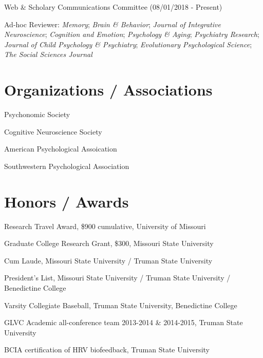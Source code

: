 \documentclass[11pt, a4paper]{awesome-cv}
\begin{document}
Web \& Scholary Communications Committee (08/01/2018 - Present)

Ad-hoc Reviewer: \emph{Memory}; \emph{Brain \& Behavior}; \emph{Journal of Integrative Neuroscience}; \emph{Cognition and Emotion}; \emph{Psychology \& Aging}; \emph{Psychiatry Research}; \emph{Journal of Child Psychology \& Psychiatry}; \emph{Evolutionary Psychological Science}; \emph{The Social Sciences Journal}

\hypertarget{organizations-associations}{%
\section{Organizations / Associations}\label{organizations-associations}}

Psychonomic Society

Cognitive Neuroscience Society

American Psychological Assoication

Southwestern Psychological Association

\hypertarget{honors-awards}{%
\section{Honors / Awards}\label{honors-awards}}

Research Travel Award, \$900 cumulative, University of Missouri

Graduate College Research Grant, \$300, Missouri State University

Cum Laude, Missouri State University / Truman State University

President's List, Missouri State University / Truman State University / Benedictine College

Varsity Collegiate Baseball, Truman State University, Benedictine College

GLVC Academic all-conference team 2013-2014 \& 2014-2015, Truman State University

BCIA certification of HRV biofeedback, Truman State University
\end{document}

